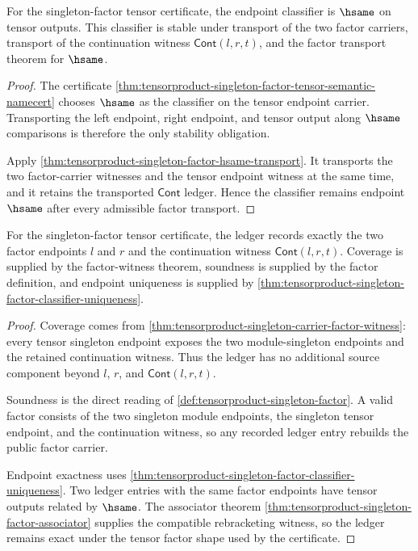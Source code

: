 \begin{theorem}
\label{thm:tensorproduct-classifier-stability-obligation}
For the singleton-factor tensor certificate, the endpoint classifier is
$\hsame$ on tensor outputs. This classifier is stable under transport of the
two factor carriers, transport of the continuation witness
$\mathsf{Cont}(l,r,t)$, and the factor transport theorem for $\hsame$.
\end{theorem}
\begin{proof}
The certificate
\autoref{thm:tensorproduct-singleton-factor-tensor-semantic-namecert} chooses
$\hsame$ as the classifier on the tensor endpoint carrier. Transporting the
left endpoint, right endpoint, and tensor output along $\hsame$ comparisons is
therefore the only stability obligation.

Apply
\autoref{thm:tensorproduct-singleton-factor-hsame-transport}. It transports
the two factor-carrier witnesses and the tensor endpoint witness at the same
time, and it retains the transported $\mathsf{Cont}$ ledger. Hence the
classifier remains endpoint $\hsame$ after every admissible factor transport.
\end{proof}

\begin{theorem}
\label{thm:tensorproduct-ledger-exactness-obligation}
For the singleton-factor tensor certificate, the ledger records exactly the
two factor endpoints $l$ and $r$ and the continuation witness
$\mathsf{Cont}(l,r,t)$. Coverage is supplied by the factor-witness theorem,
soundness is supplied by the factor definition, and endpoint uniqueness is
supplied by
\autoref{thm:tensorproduct-singleton-factor-classifier-uniqueness}.
\end{theorem}
\begin{proof}
Coverage comes from
\autoref{thm:tensorproduct-singleton-carrier-factor-witness}: every tensor
singleton endpoint exposes the two module-singleton endpoints and the retained
continuation witness. Thus the ledger has no additional source component
beyond $l$, $r$, and $\mathsf{Cont}(l,r,t)$.

Soundness is the direct reading of
\autoref{def:tensorproduct-singleton-factor}. A valid factor consists of the
two singleton module endpoints, the singleton tensor endpoint, and the
continuation witness, so any recorded ledger entry rebuilds the public factor
carrier.

Endpoint exactness uses
\autoref{thm:tensorproduct-singleton-factor-classifier-uniqueness}. Two
ledger entries with the same factor endpoints have tensor outputs related by
$\hsame$. The associator theorem
\autoref{thm:tensorproduct-singleton-factor-associator} supplies the compatible
rebracketing witness, so the ledger remains exact under the tensor factor
shape used by the certificate.
\end{proof}

